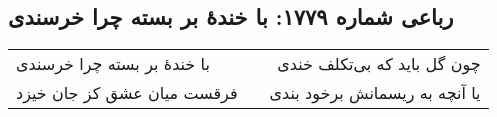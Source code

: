 \begin{center}
\section*{رباعی شماره ۱۷۷۹: با خندهٔ بر بسته چرا خرسندی}
\label{sec:1779}
\begin{longtable}{l p{0.5cm} r}
با خندهٔ بر بسته چرا خرسندی
&&
چون گل باید که بی‌تکلف خندی
\\
فرقست میان عشق کز جان خیزد
&&
یا آنچه به ریسمانش برخود بندی
\\
\end{longtable}
\end{center}
